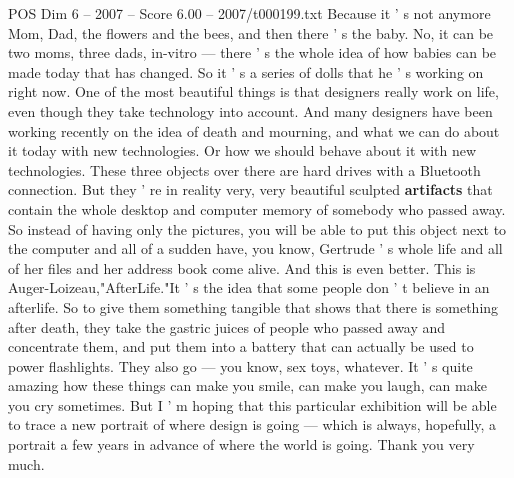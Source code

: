 \begin{textsample}{POS Dim 6 – 2007 – Score 6.00 – 2007/t000199.txt}
Because it ' s not anymore Mom, Dad, the flowers and the bees, and then there ' s the baby.
No, it can be two moms, three dads, in-vitro — there ' s the whole idea of how babies can be made today that has changed.
So it ' s a series of dolls that he ' s working on right now.
One of the most beautiful things is that designers really work on life, even though they take technology into account.
And many designers have been working recently on the idea of death and mourning, and what we can do about it today with new technologies.
Or how we should behave about it with new technologies.
These three objects over there are hard drives with a Bluetooth connection.
But they ' re in reality very, very beautiful sculpted \textbf{artifacts} that contain the whole desktop and computer memory of somebody who passed away.
So instead of having only the pictures, you will be able to put this object next to the computer and all of a sudden have, you know, Gertrude ' s whole life and all of her files and her address book come alive.
And this is even better.
This is Auger-Loizeau,"AfterLife."It ' s the idea that some people don ' t believe in an afterlife.
So to give them something tangible that shows that there is something after death, they take the gastric juices of people who passed away and concentrate them, and put them into a battery that can actually be used to power flashlights.
They also go — you know, sex toys, whatever.
It ' s quite amazing how these things can make you smile, can make you laugh, can make you cry sometimes.
But I ' m hoping that this particular exhibition will be able to trace a new portrait of where design is going — which is always, hopefully, a portrait a few years in advance of where the world is going.
Thank you very much.

\end{textsample}
